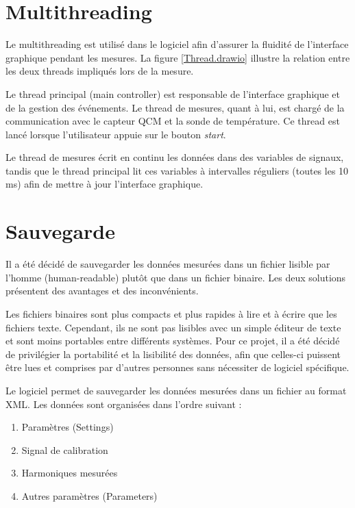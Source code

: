 \section{Multithreading}

Le multithreading est utilisé dans le logiciel afin d'assurer la fluidité de l'interface graphique pendant les mesures. La figure \ref{Thread.drawio} illustre la relation entre les deux threads impliqués lors de la mesure.

Le thread principal (main controller) est responsable de l'interface graphique et de la gestion des événements.  
Le thread de mesures, quant à lui, est chargé de la communication avec le capteur QCM et la sonde de température.  
Ce thread est lancé lorsque l'utilisateur appuie sur le bouton \textit{start}.  

Le thread de mesures écrit en continu les données dans des variables de signaux, tandis que le thread principal lit ces variables à intervalles réguliers (toutes les 10 ms) afin de mettre à jour l'interface graphique.
\newpage
\section{Sauvegarde}

Il a été décidé de sauvegarder les données mesurées dans un fichier lisible par l'homme (human-readable) plutôt que dans un fichier binaire.  
Les deux solutions présentent des avantages et des inconvénients.

Les fichiers binaires sont plus compacts et plus rapides à lire et à écrire que les fichiers texte. Cependant, ils ne sont pas lisibles avec un simple éditeur de texte et sont moins portables entre différents systèmes.  
Pour ce projet, il a été décidé de privilégier la portabilité et la lisibilité des données, afin que celles-ci puissent être lues et comprises par d'autres personnes sans nécessiter de logiciel spécifique.

Le logiciel permet de sauvegarder les données mesurées dans un fichier au format XML.  
Les données sont organisées dans l'ordre suivant :
\begin{enumerate}
    \item Paramètres (Settings)
    \item Signal de calibration
    \item Harmoniques mesurées
    \item Autres paramètres (Parameters)
\end{enumerate}
